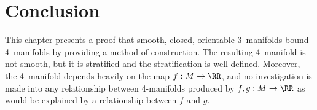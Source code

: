 \section{Conclusion}

This chapter presents a proof that smooth, closed, orientable 3--manifolds bound 4--manifolds by providing a method of construction.
The resulting 4--manifold is not smooth, but it is stratified and the stratification is well-defined.
Moreover, the 4--manifold depends heavily on the map $f:M\to\RR$, and no investigation is made into any relationship between 4-manifolds produced by $f,g:M\to\RR$ as would be explained by a relationship between $f$ and $g$.



